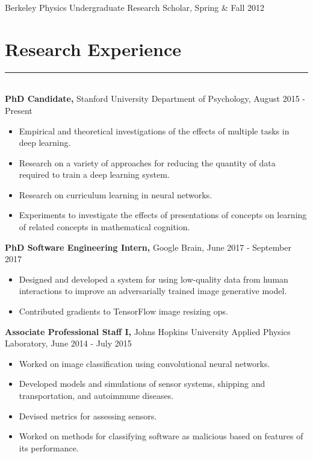 \documentclass[margin]{res}
\begin{document}
\begin{resume}
Berkeley Physics Undergraduate Research Scholar, Spring \& Fall 2012
\vspace{1pt}\section{Research Experience} \vspace{-15pt} \rule{\textwidth}{0.5pt} \\[3pt]
{\bf PhD Candidate,} Stanford University Department of Psychology, August 2015 - Present 
\begin{itemize} \itemsep -2pt
  \item Empirical and theoretical investigations of the effects of multiple tasks in deep learning. 
  \item Research on a variety of approaches for reducing the quantity of data required to train a deep learning system.
  \item Research on curriculum learning in neural networks.
  \item Experiments to investigate the effects of presentations of concepts on learning of related concepts in mathematical cognition.
\end{itemize}\vspace{-8pt}
{\bf PhD Software Engineering Intern,} Google Brain, June 2017 - September 2017 
\begin{itemize} \itemsep -2pt
  \item Designed and developed a system for using low-quality data from human interactions to improve an adversarially trained image generative model. 
  \item Contributed gradients to TensorFlow image resizing ops.
\end{itemize}\vspace{-8pt}
{\bf Associate Professional Staff I,} Johns Hopkins University Applied Physics Laboratory, June 2014 - July 2015 
\begin{itemize} \itemsep -2pt
 \item Worked on image classification using convolutional neural networks.  \item Developed models and simulations of sensor systems, shipping and transportation, and autoimmune diseases. \item Devised metrics for assessing sensors. \item Worked on methods for classifying software as malicious based on features of its performance. \end{itemize}\vspace{-8pt}

\end{resume}
\end{document}
